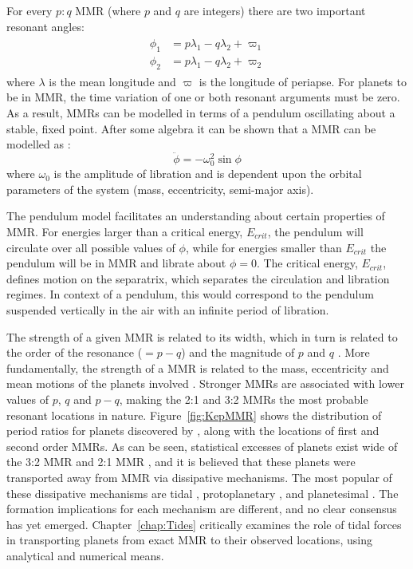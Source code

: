 For every $p:q$ MMR (where $p$ and $q$ are integers) there are two important resonant angles:
\begin{align}
\begin{split}
\phi_1 &= p\lambda_1 - q\lambda_2 + \varpi_1 \\
\phi_2 &= p\lambda_1 - q\lambda_2 + \varpi_2 
\label{eq:MMR}
\end{split}
\end{align}
where $\lambda$ is the mean longitude and $\varpi$ is the longitude of periapse. 
For planets to be in MMR, the time variation of one or both resonant arguments must be zero.
As a result, MMRs can be modelled in terms of a pendulum oscillating about a stable, fixed point. 
After some algebra it can be shown that a MMR can be modelled as \citep{SSD1999}:
\begin{equation}
\ddot{\phi} = -\omega_0^2 \sin\phi
\label{eq:pendulum}
\end{equation}
where $\omega_0$ is the amplitude of libration and is dependent upon the orbital parameters of the system (mass, eccentricity, semi-major axis).

The pendulum model facilitates an understanding about certain properties of MMR. 
For energies larger than a critical energy, $E_{crit}$, the pendulum will circulate over all possible values of $\phi$, while for energies smaller than $E_{crit}$ the pendulum will be in MMR and librate about $\phi = 0$.
The critical energy, $E_{crit}$, defines motion on the separatrix, which separates the circulation and libration regimes. 
In context of a pendulum, this would correspond to the pendulum suspended vertically in the air with an infinite period of libration. 

The strength of a given MMR is related to its width, which in turn is related to the order of the resonance ($= p - q$) and the magnitude of $p$ and $q$ \citep{SSD1999}. 
More fundamentally, the strength of a MMR is related to the mass, eccentricity and mean motions of the planets involved \citep{SSD1999}.
Stronger MMRs are associated with lower values of $p$, $q$ and $p-q$, making the 2:1 and 3:2 MMRs the most probable resonant locations in nature. 
Figure~\ref{fig:KepMMR} shows the distribution of period ratios for planets discovered by \kep, along with the locations of first and second order MMRs. 
As can be seen, statistical excesses of planets exist wide of the 3:2 MMR and 2:1 MMR \citep{Lissauer2011,Fabrycky2014,Steffen2015}, and it is believed that these planets were transported away from MMR  via dissipative mechanisms.
The most popular of these dissipative mechanisms are tidal \citep{LithwickWu2012, Batygin2013, Delisle2014}, protoplanetary \citep{Rein2012b, Baruteau2013, Goldreich2014}, and planetesimal \citep{Moore2013, Chatterjee2015}.
The formation implications for each mechanism are different, and no clear consensus has yet emerged.
Chapter~\ref{chap:Tides} critically examines the role of tidal forces in transporting \kep planets from exact MMR to their observed locations, using analytical and numerical means. 

